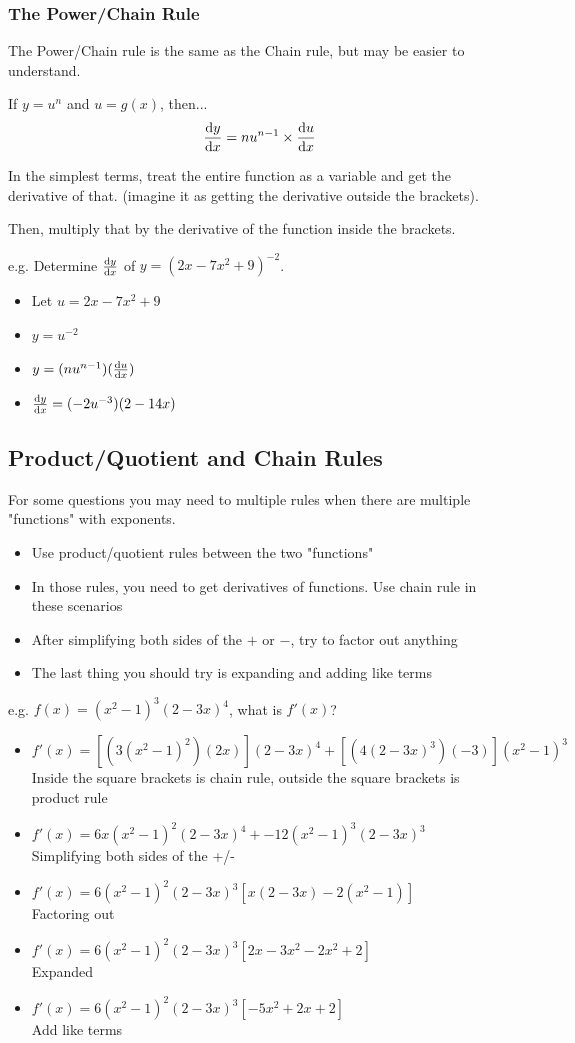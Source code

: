 \documentclass[a4paper,12pt]{article}
\begin{document}
\subsubsection{The Power/Chain Rule}
The Power/Chain rule is the same as the Chain rule, but may be easier to understand.

If $y = u^n$ and $u = g(x)$, then...
$$\dv{y}{x} = nu^{n-1}\times\dv{u}{x}$$

In the simplest terms, treat the entire function as a variable and get the derivative of that. (imagine it as getting the derivative outside the brackets). 

Then, multiply that by the derivative of the function inside the brackets.

e.g. Determine $\dv{y}{x}$ of $y=(2x-7x^2+9)^{-2}$.
\begin{itemize}
    \item{Let $u = 2x-7x^2+9$}
    \item{$y = u^{-2}$}
    \item{$y = (nu^{n-1})(\dv{u}{x})$}
    \item{$\dv{y}{x} = (-2u^{-3})(2-14x)$}
\end{itemize}

\subsection{Product/Quotient and Chain Rules}
For some questions you may need to multiple rules when there are multiple "functions" with exponents.

\begin{itemize}
    \item{Use product/quotient rules between the two "functions"}
    \item{In those rules, you need to get derivatives of functions. Use chain rule in these scenarios}
    \item{After simplifying both sides of the $+$ or $-$, try to factor out anything}
    \item{The last thing you should try is expanding and adding like terms}
\end{itemize}

e.g. $f(x) = (x^2-1)^3(2-3x)^4$, what is $f'(x)$?
\begin{itemize}
    \item{$f'(x) = [(3(x^2 - 1)^2)(2x)](2-3x)^4 + [(4(2-3x)^3)(-3)](x^2-1)^3$ \\Inside the square brackets is chain rule, outside the square brackets is product rule}
    \item{$f'(x) = 6x(x^2-1)^2(2-3x)^4 + -12(x^2-1)^3(2-3x)^3$ \\Simplifying both sides of the +/-}
    \item{$f'(x) = 6(x^2-1)^2(2-3x)^3[x(2-3x) - 2(x^2-1)]$ \\Factoring out}
    \item{$f'(x) = 6(x^2-1)^2(2-3x)^3[2x-3x^2 - 2x^2+2]$ \\Expanded}
    \item{$f'(x) = 6(x^2-1)^2(2-3x)^3[-5x^2+2x+2]$ \\Add like terms}
\end{itemize}
\end{document}
